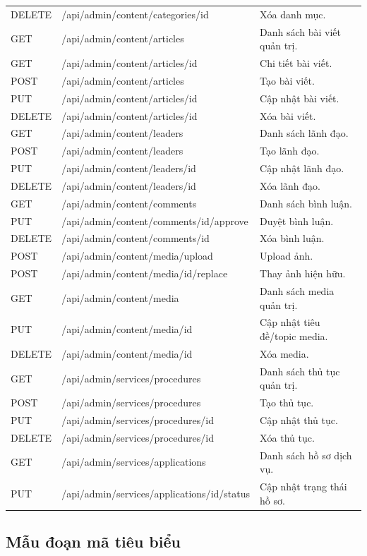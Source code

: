 \documentclass[12pt,a4paper]{article}
\begin{document}
\begin{longtable}{p{1.8cm}p{6.2cm}p{5.2cm}}
DELETE & /api/admin/content/categories/{id} & Xóa danh mục. \\
GET & /api/admin/content/articles & Danh sách bài viết quản trị. \\
GET & /api/admin/content/articles/{id} & Chi tiết bài viết. \\
POST & /api/admin/content/articles & Tạo bài viết. \\
PUT & /api/admin/content/articles/{id} & Cập nhật bài viết. \\
DELETE & /api/admin/content/articles/{id} & Xóa bài viết. \\
GET & /api/admin/content/leaders & Danh sách lãnh đạo. \\
POST & /api/admin/content/leaders & Tạo lãnh đạo. \\
PUT & /api/admin/content/leaders/{id} & Cập nhật lãnh đạo. \\
DELETE & /api/admin/content/leaders/{id} & Xóa lãnh đạo. \\
GET & /api/admin/content/comments & Danh sách bình luận. \\
PUT & /api/admin/content/comments/{id}/approve & Duyệt bình luận. \\
DELETE & /api/admin/content/comments/{id} & Xóa bình luận. \\
POST & /api/admin/content/media/upload & Upload ảnh. \\
POST & /api/admin/content/media/{id}/replace & Thay ảnh hiện hữu. \\
GET & /api/admin/content/media & Danh sách media quản trị. \\
PUT & /api/admin/content/media/{id} & Cập nhật tiêu đề/topic media. \\
DELETE & /api/admin/content/media/{id} & Xóa media. \\
GET & /api/admin/services/procedures & Danh sách thủ tục quản trị. \\
POST & /api/admin/services/procedures & Tạo thủ tục. \\
PUT & /api/admin/services/procedures/{id} & Cập nhật thủ tục. \\
DELETE & /api/admin/services/procedures/{id} & Xóa thủ tục. \\
GET & /api/admin/services/applications & Danh sách hồ sơ dịch vụ. \\
PUT & /api/admin/services/applications/{id}/status & Cập nhật trạng thái hồ sơ. \\
\bottomrule
\end{longtable}

\subsection{Mẫu đoạn mã tiêu biểu}
\end{document}
